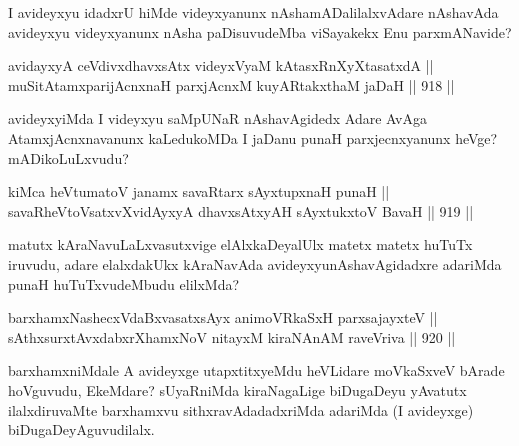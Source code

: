 \begin{artha}
I avideyxyu idadxrU hiMde videyxyanunx nAshamADalilalxvAdare nAshavAda avideyxyu videyxyanunx nAsha paDisuvudeMba viSayakekx Enu parxmANavide?
\end{artha}

\begin{shl}
avidayxyA ceVdivxdhavxsAtx videyxVyaM kAtasxRnXyXtasatxdA || \\
muSitAtamxparijAcnxnaH parxjAcnxM kuyARtakxthaM jaDaH \hfill || 918 ||  
\end{shl}

\begin{artha}
avideyxyiMda I videyxyu saMpUNaR nAshavAgidedx Adare AvAga AtamxjAcnxnavanunx kaLedukoMDa I jaDanu punaH parxjecnxyanunx heVge? mADikoLuLxvudu?
\end{artha}

\begin{shl}
kiMca heVtumatoV janamx savaRtarx sAyxtupxnaH punaH || \\
savaRheVtoVsatxvXvidAyxyA dhavxsAtxyAH sAyxtukxtoV BavaH \hfill || 919 ||  
\end{shl}

\begin{artha}
matutx kAraNavuLaLxvasutxvige elAlxkaDeyalUlx matetx matetx huTuTx iruvudu, adare elalxdakUkx kAraNavAda avideyxyunAshavAgidadxre adariMda punaH huTuTxvudeMbudu elilxMda?
\end{artha}

\begin{shl}
barxhamxNashecxVdaBxvasatxsAyx animoVRkaSxH parxsajayxteV || \\
sAthxsurxtAvxdabxrXhamxNoV nitayxM kiraNAnAM raveVriva \hfill || 920 ||  
\end{shl}

\begin{artha}
barxhamxniMdale A avideyxge utapxtitxyeMdu heVLidare moVkaSxveV bArade hoVguvudu, EkeMdare? sUyaRniMda kiraNagaLige biDugaDeyu yAvatutx ilalxdiruvaMte barxhamxvu sithxravAdadadxriMda adariMda (I avideyxge) biDugaDeyAguvudilalx.
\end{artha}
